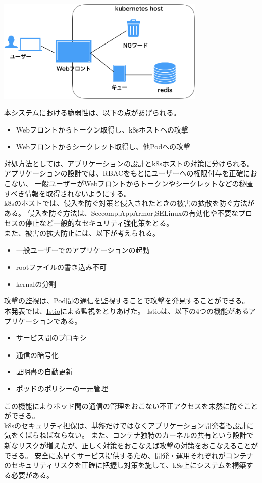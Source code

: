 \includegraphics[width=10cm]{Web3tiers.png}

本システムにおける脆弱性は、以下の点があげられる。

\begin{itemize}
\item Webフロントからトークン取得し、k8sホストへの攻撃
\item Webフロントからシークレット取得し、他Podへの攻撃
\end{itemize}

対処方法としては、アプリケーションの設計とk8sホストの対策に分けられる。\\

アプリケーションの設計では、RBACをもとにユーザーへの権限付与を正確におこない、
一般ユーザーがWebフロントからトークンやシークレットなどの秘匿すべき情報を取得されないようにする。\\

k8sのホストでは、侵入を防ぐ対策と侵入されたときの被害の拡散を防ぐ方法がある。
侵入を防ぐ方法は、Seccomp,AppArmor,SELinuxの有効化や不要なプロセスの停止など一般的なセキュリティ強化策をとる。\\

また、被害の拡大防止には、以下が考えられる。

\begin{itemize}
\item 一般ユーザーでのアプリケーションの起動
\item rootファイルの書き込み不可
\item kernalの分割
\end{itemize}

攻撃の監視は、Pod間の通信を監視することで攻撃を発見することができる。
本発表では、\href{https://istio.io/}{Istio}による監視をとりあげた。
Istioは、以下の4つの機能があるアプリケーションである。

\begin{itemize}
\item サービス間のプロキシ
\item 通信の暗号化
\item 証明書の自動更新
\item ポッドのポリシーの一元管理
\end{itemize}

この機能によりポッド間の通信の管理をおこない不正アクセスを未然に防ぐことができる。\\

k8sのセキュリティ担保は、基盤だけではなくアプリケーション開発者も設計に気をくばらねばならない。
また、コンテナ独特のカーネルの共有という設計で新なリスクが増えたが、正しく対策をおこなえば攻撃の対策をおこなえることができる。
安全に素早くサービス提供するため、開発・運用それぞれがコンテナのセキュリティリスクを正確に把握し対策を施して、k8s上にシステムを構築する必要がある。
